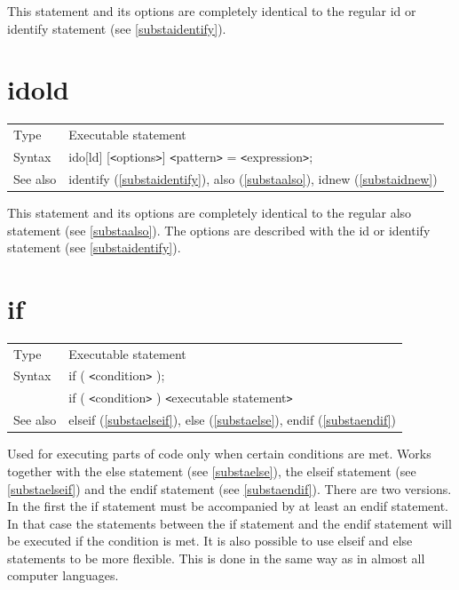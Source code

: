 \noindent This statement and its options are completely 
identical to the regular id or identify statement 
(see \ref{substaidentify}). \vspace{10mm}


\section{idold}
\label{substaidold}

\noindent \begin{tabular}{ll}
Type & Executable statement\\
Syntax & ido[ld] [{\tt<}options{\tt>}] {\tt<}pattern{\tt>} = {\tt<}expression{\tt>};
\\ See also & identify (\ref{substaidentify}),
              also (\ref{substaalso}),
              idnew (\ref{substaidnew})
\end{tabular}\vspace{4mm}

\noindent This statement and its options are completely 
identical to the regular also statement (see \ref{substaalso}). 
The options are described with the id or identify 
statement (see \ref{substaidentify}).
\vspace{10mm}

 
\section{if}
\label{substaif}

\noindent \begin{tabular}{ll}
Type & Executable statement\\
Syntax & if ( {\tt<}condition{\tt>} ); \\
       & if ( {\tt<}condition{\tt>} ) {\tt<}executable statement{\tt>}
\\ See also & elseif (\ref{substaelseif}),
              else (\ref{substaelse}),
              endif (\ref{substaendif})
\end{tabular} \vspace{4mm}

\noindent Used for executing parts of code only when certain 
conditions are met. Works together with the 
else statement (see \ref{substaelse}), the elseif 
statement (see \ref{substaelseif}) and the endif statement 
(see \ref{substaendif}). There are two versions. In the first the if 
statement must be accompanied by at least an endif statement. In that case 
the statements between the if statement and the endif statement will be 
executed if the condition is met. It is also possible to use elseif and 
else statements to be more flexible. This is done in the same way as in 
almost all computer languages.


